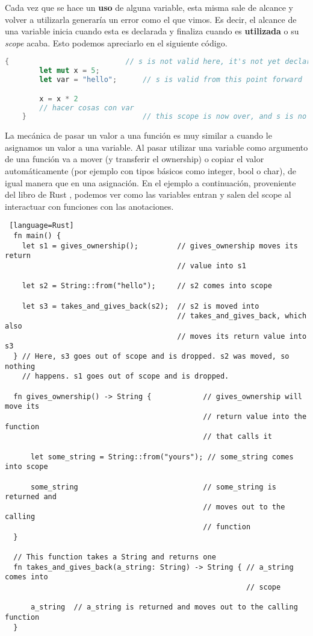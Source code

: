 Cada vez que se hace un \textbf{uso} de alguna variable, esta misma sale de alcance y volver a utilizarla generaría un error como el que vimos. Es decir, el alcance de una variable inicia cuando esta es declarada y finaliza cuando es \textbf{utilizada} o su \textit{scope} acaba. Esto podemos apreciarlo en el siguiente código.

\begin{lstlisting}[language=Rust]
    {                           // s is not valid here, it's not yet declared
        let mut x = 5;
        let var = "hello";      // s is valid from this point forward

        x = x * 2
        // hacer cosas con var
    }                           // this scope is now over, and s is no longer valid
\end{lstlisting}


La mecánica de pasar un valor a una función es muy similar a cuando le asignamos un valor a una variable. Al pasar utilizar una variable como argumento de una función va a mover (y transferir el ownership) o copiar el valor automáticamente (por ejemplo con tipos básicos como integer, bool o char), de igual manera que en una asignación. En el ejemplo a continuación, proveniente del libro de Rust \citep{rustbook}, podemos ver como  las variables entran y salen del scope al interactuar con funciones con las anotaciones.

\begin{lstlisting} [language=Rust]
  fn main() {
    let s1 = gives_ownership();         // gives_ownership moves its return
                                        // value into s1

    let s2 = String::from("hello");     // s2 comes into scope

    let s3 = takes_and_gives_back(s2);  // s2 is moved into
                                        // takes_and_gives_back, which also
                                        // moves its return value into s3
  } // Here, s3 goes out of scope and is dropped. s2 was moved, so nothing
    // happens. s1 goes out of scope and is dropped.

  fn gives_ownership() -> String {            // gives_ownership will move its
                                              // return value into the function
                                              // that calls it

      let some_string = String::from("yours"); // some_string comes into scope

      some_string                             // some_string is returned and
                                              // moves out to the calling
                                              // function
  }

  // This function takes a String and returns one
  fn takes_and_gives_back(a_string: String) -> String { // a_string comes into
                                                        // scope

      a_string  // a_string is returned and moves out to the calling function
  }
\end{lstlisting}


